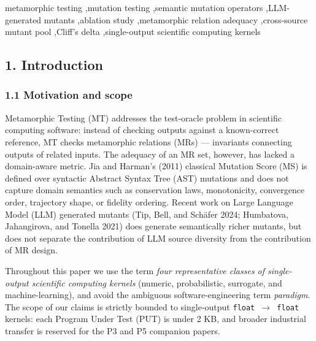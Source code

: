 \documentclass[review,12pt,authoryear]{elsarticle}
\begin{document}
\begin{frontmatter}
\begin{abstract}
\textbf{Conclusion.} Within this design, the MR-design axis (c-class primary-MP choice) is the lever on the aligned-vs-cross effect size; the LLM-identity axis (Claude / GPT / DeepSeek under an identical prompt) shifts $\delta$ by $\leq 0.01$ across two MP conditions. The strong-sense source-diversity test with per-LLM differential prompts is deferred to P4. The \S3.5 evidence (5.14\% AST overlap, 0/0/0 unreachability for HP / SI / TF under first-order syntactic tools) is independent of this caveat. SMS is a backward-compatible adequacy metric for domain-semantic MR sets.
\end{abstract}

\begin{keyword}
metamorphic testing \sep mutation testing \sep semantic mutation operators \sep LLM-generated mutants \sep ablation study \sep metamorphic relation adequacy \sep cross-source mutant pool \sep Cliff's delta \sep single-output scientific computing kernels
\end{keyword}

\end{frontmatter}

\subsection{1. Introduction}\label{introduction}

\subsubsection{1.1 Motivation and scope}\label{motivation-and-scope}

Metamorphic Testing (MT) addresses the test-oracle problem in scientific
computing software: instead of checking outputs against a known-correct
reference, MT checks metamorphic relations (MRs) --- invariants
connecting outputs of related inputs. The adequacy of an MR set,
however, has lacked a domain-aware metric. Jia and Harman's (2011)
classical Mutation Score (MS) is defined over syntactic Abstract Syntax
Tree (AST) mutations and does not capture domain semantics such as
conservation laws, monotonicity, convergence order, trajectory shape, or
fidelity ordering. Recent work on Large Language Model (LLM) generated
mutants (Tip, Bell, and Schäfer 2024; Humbatova, Jahangirova, and
Tonella 2021) does generate semantically richer mutants, but does not
separate the contribution of LLM source diversity from the contribution
of MR design.

Throughout this paper we use the term \emph{four representative classes
of single-output scientific computing kernels} (numeric, probabilistic,
surrogate, and machine-learning), and avoid the ambiguous
software-engineering term \emph{paradigm}. The scope of our claims is
strictly bounded to single-output \texttt{float\ $\to$\ float} kernels: each
Program Under Test (PUT) is under 2 KB, and broader industrial transfer
is reserved for the P3 and P5 companion papers.
\end{document}
